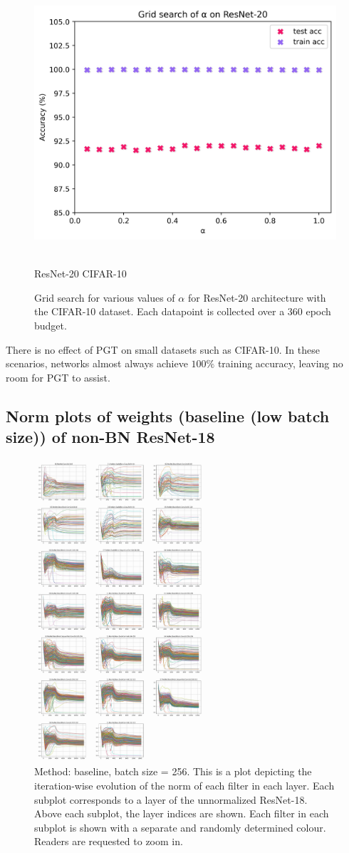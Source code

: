 \documentclass[runningheads]{llncs}
\begin{document}
\begin{figure}[ht]
\centering
\includegraphics[width=0.5\columnwidth]{cifar10_grid_search}
\caption{\\ResNet-20 CIFAR-10}
\caption{ Grid search for various values of $\alpha$ for ResNet-20 architecture with the
CIFAR-10 dataset. Each datapoint is collected over a 360 epoch budget. }
\label{fig:grid_searchc}
\end{figure}


There is no effect of PGT on small datasets such as CIFAR-10. In these scenarios,
networks almost always achieve $100\%$ training accuracy, leaving no room for PGT to
assist.



\clearpage

\subsection{Norm plots of weights (baseline (low batch size)) of non-BN ResNet-18}
\label{sec:plots1}
\begin{figure}[ht]
\centering
\includegraphics[width=0.57\textwidth]{compressed/baseline-w_norm}
\caption{ Method: baseline, batch size = 256. This is a plot depicting the
iteration-wise evolution of the norm of each filter in each layer. Each subplot
corresponds to a layer of the unnormalized ResNet-18. Above each subplot, the layer
indices are shown. Each filter in each subplot is shown with a separate and randomly
determined colour. Readers are requested to zoom in. } 
\end{figure}
\end{document}

